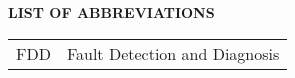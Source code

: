 
{
  \thispagestyle{empty}

  {\bfseries\Large LIST OF ABBREVIATIONS}

  \vspace*{1cm}

  \begin{tabular}{p{3cm}l}
    FDD      & Fault Detection and Diagnosis \\

  \end{tabular}

  \newpage
}

